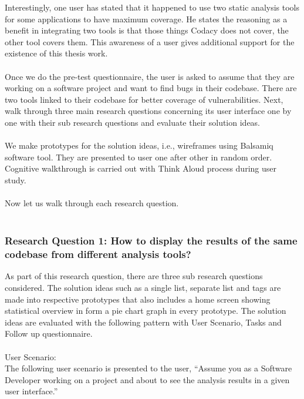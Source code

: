 Interestingly, one user has stated that it happened to use two static analysis tools for some applications to have maximum coverage. He states the reasoning as a benefit in integrating two tools is that those things Codacy does not cover, the other tool covers them. This awareness of a user gives additional support for the existence of this thesis work.
\\ \\

Once we do the pre-test questionnaire, the user is asked to assume that they are working on a software project and want to find bugs in their codebase. There are two tools linked to their codebase for better coverage of vulnerabilities. Next, walk through three main research questions concerning its user interface one by one with their sub research questions and evaluate their solution ideas. \\ \\

We make prototypes for the solution ideas, i.e., wireframes using Balsamiq software tool. They are presented to user one after other in random order. Cognitive walkthrough is carried out with Think Aloud process during user study. \\ \\

Now let us walk through each research question. \\ \\


\subsubsection{Research Question 1: How to display the results of the same codebase from different analysis tools?}

As part of this research question, there are three sub research questions considered. The solution ideas such as a single list, separate list and tags are made into respective prototypes that also includes a home screen showing statistical overview in form a pie chart graph in every prototype. The solution ideas are evaluated with the following pattern with User Scenario, Tasks and Follow up questionnaire. \\ \\

User Scenario: \\

The following user scenario is presented to the user, “Assume you as a Software Developer working on a project and about to see the analysis results in a given user interface.” \\ \\


